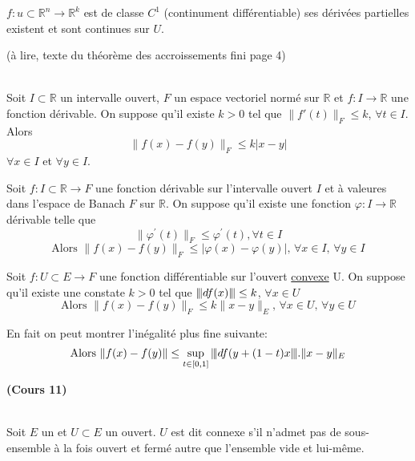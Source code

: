 \documentclass[12pt,a4paper]{article}
\begin{document}
\begin{flushleft}
\begin{thm}
$f: u \subset \mathbb{R}^n \longrightarrow \mathbb{R}^k$ est de classe $C^1$ (continument différentiable) \ssi ses dérivées partielles existent et sont continues sur $U$.
\end{thm} 

(à lire, texte du théorème des accroissements fini page 4)\\~\\

\begin{thm}
Soit $I \subset \mathbb{R}$ un intervalle ouvert, $F$ un espace vectoriel normé sur $\mathbb{R}$ et $f: I \longrightarrow \mathbb{R}$ une fonction dérivable. On suppose qu'il existe $k > 0$ tel que $\lVert f'(t) \rVert_F \leq k$, $\forall t \in I$. Alors $$ \lVert f(x) - f(y) \rVert_F \leq k |x-y|$$ $\forall x \in I$ et $\forall y \in I$.
\end{thm}

\begin{thm}
Soit $f: I \subset \mathbb{R} \longrightarrow F$ une fonction dérivable sur l'intervalle ouvert $I$ et à valeures dans l'espace de Banach $F$ sur $\mathbb{R}$. On suppose qu'il existe une fonction $\varphi : I \longrightarrow \mathbb{R}$ dérivable telle que $$\lVert \varphi^\prime (t) \rVert_F \leq \varphi^\prime (t), \forall t\in I$$
$$ \text{Alors } \lVert f(x) - f(y) \rVert_F \leq | \varphi(x) - \varphi(y) | \text{, } \forall x \in I \text{, } \forall y \in I$$
\end{thm}

\begin{thm}
Soit $f: U \subset E \longrightarrow F$ une fonction différentiable sur l'ouvert \underline{convexe} U. On suppose qu'il existe une constate $k > 0$ tel que ${\left\vert\kern-0.25ex\left\vert\kern-0.25ex\left\vert df(x) \right\vert\kern-0.25ex\right\vert\kern-0.25ex\right\vert} \leq k$, $\forall x \in U$ $$ \text{Alors } \lVert f(x) - f(y) \rVert_F \leq k \lVert x-y \rVert_E \text{, } \forall x \in U \text{, } \forall y \in U$$
\end{thm}

\begin{rem}
En fait on peut montrer l'inégalité plus fine suivante: $$ \text{Alors } \lVert f(x) - f(y) \rVert \leq \sup\limits_{t \in [0,1]} {\left\vert\kern-0.25ex\left\vert\kern-0.25ex\left\vert df(y + (1-t)x \right\vert\kern-0.25ex\right\vert\kern-0.25ex\right\vert} . \lVert x-y \rVert_E$$
\end{rem}

\textbf{(Cours 11)}\\~\\


\begin{mydef}
Soit $E$ un \evn et $U \subset E$ un ouvert. $U$ est dit connexe s'il n'admet pas de sous-ensemble à la fois ouvert et fermé autre que l'ensemble vide et lui-même.
\end{mydef}


\end{flushleft}
\end{document}
